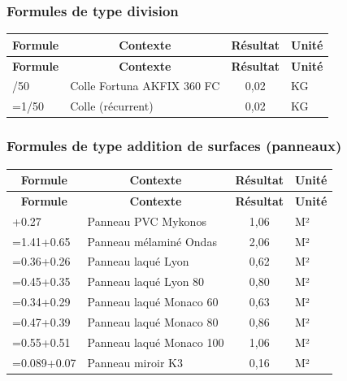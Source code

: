 \documentclass[12pt,a4paper]{article}
\begin{document}
\subsubsection{Formules de type division}

\begin{longtable}{|p{6cm}|p{5cm}|c|p{3cm}|}
\hline
\multicolumn{1}{|c|}{\textbf{Formule}} & \multicolumn{1}{c|}{\textbf{Contexte}} & \multicolumn{1}{c|}{\textbf{Résultat}} & \multicolumn{1}{c|}{\textbf{Unité}} \\
\hline
\endfirsthead
\hline
\multicolumn{1}{|c|}{\textbf{Formule}} & \multicolumn{1}{c|}{\textbf{Contexte}} & \multicolumn{1}{c|}{\textbf{Résultat}} & \multicolumn{1}{c|}{\textbf{Unité}} \\
\hline
\endhead
\hline
\endfoot
=1/50 & Colle Fortuna AKFIX 360 FC & 0,02 & KG \\
=1/50 & Colle (récurrent) & 0,02 & KG \\
\hline
\end{longtable}

\subsubsection{Formules de type addition de surfaces (panneaux)}

\begin{longtable}{|p{6cm}|p{5cm}|c|p{3cm}|}
\hline
\multicolumn{1}{|c|}{\textbf{Formule}} & \multicolumn{1}{c|}{\textbf{Contexte}} & \multicolumn{1}{c|}{\textbf{Résultat}} & \multicolumn{1}{c|}{\textbf{Unité}} \\
\hline
\endfirsthead
\hline
\multicolumn{1}{|c|}{\textbf{Formule}} & \multicolumn{1}{c|}{\textbf{Contexte}} & \multicolumn{1}{c|}{\textbf{Résultat}} & \multicolumn{1}{c|}{\textbf{Unité}} \\
\hline
\endhead
\hline
\endfoot
=0.79+0.27 & Panneau PVC Mykonos & 1,06 & M² \\
=1.41+0.65 & Panneau mélaminé Ondas & 2,06 & M² \\
=0.36+0.26 & Panneau laqué Lyon & 0,62 & M² \\
=0.45+0.35 & Panneau laqué Lyon 80 & 0,80 & M² \\
=0.34+0.29 & Panneau laqué Monaco 60 & 0,63 & M² \\
=0.47+0.39 & Panneau laqué Monaco 80 & 0,86 & M² \\
=0.55+0.51 & Panneau laqué Monaco 100 & 1,06 & M² \\
=0.089+0.07 & Panneau miroir K3 & 0,16 & M² \\
\hline
\end{longtable}
\end{document}
